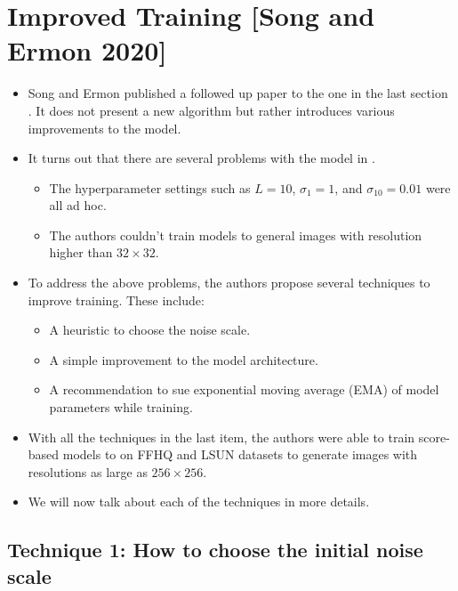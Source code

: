 \documentclass[10pt]{article}
\begin{document}
\section{Improved Training [Song and Ermon 2020]}

\begin{itemize}
  \item Song and Ermon published a followed up paper \cite{Song:2020} to the one in the last section \cite{Song:2019}. It does not present a new algorithm but rather introduces various improvements to the model.
  
  \item It turns out that there are several problems with the model in \cite{Song:2019}.
  \begin{itemize}
    \item The hyperparameter settings such as $L = 10$, $\sigma_1 = 1$, and $\sigma_{10} = 0.01$ were all ad hoc.
    
    \item The authors couldn't train models to general images with resolution higher than $32 \times 32$.
  \end{itemize}

  \item To address the above problems, the authors propose several techniques to improve training. These include:
  \begin{itemize}
    \item A heuristic to choose the noise scale.
    \item A simple improvement to the model architecture.
    \item A recommendation to sue exponential moving average (EMA) of model parameters while training.
  \end{itemize}

  \item With all the techniques in the last item, the authors were able to train score-based models to on FFHQ and LSUN datasets to generate images with resolutions as large as $256 \times 256$.
  
  \item We will now talk about each of the techniques in more details.
\end{itemize}

\subsection{Technique 1: How to choose the initial noise scale}
\end{document}
